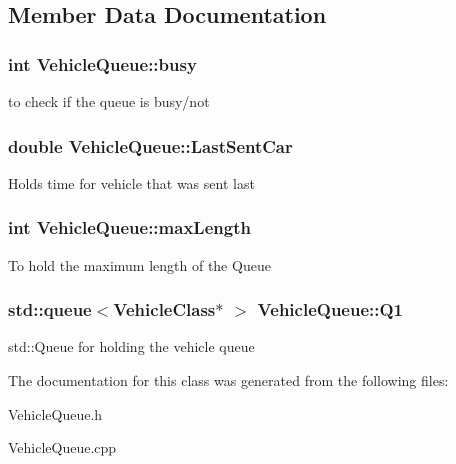 \subsection{Member Data Documentation}
\hypertarget{class_vehicle_queue_a4ce16496b3665d0b91a8b5baf158c3a3}{
\subsubsection[{busy}]{\setlength{\rightskip}{0pt plus 5cm}int Vehicle\-Queue\-::busy}}\label{class_vehicle_queue_a4ce16496b3665d0b91a8b5baf158c3a3}
to check if the queue is busy/not \hypertarget{class_vehicle_queue_a329310055fa8fd635fd6740a8400b88d}{
\subsubsection[{Last\-Sent\-Car}]{\setlength{\rightskip}{0pt plus 5cm}double Vehicle\-Queue\-::\-Last\-Sent\-Car}}\label{class_vehicle_queue_a329310055fa8fd635fd6740a8400b88d}
Holds time for vehicle that was sent last \hypertarget{class_vehicle_queue_a8634f859977fc6937f91abc302d56318}{
\subsubsection[{max\-Length}]{\setlength{\rightskip}{0pt plus 5cm}int Vehicle\-Queue\-::max\-Length}}\label{class_vehicle_queue_a8634f859977fc6937f91abc302d56318}
To hold the maximum length of the Queue \hypertarget{class_vehicle_queue_a64dd34f2ca5bee22e9bf07be665c4d13}{
\subsubsection[{Q1}]{\setlength{\rightskip}{0pt plus 5cm}std\-::queue$<${\bf Vehicle\-Class}$\ast$ $>$ Vehicle\-Queue\-::\-Q1}}\label{class_vehicle_queue_a64dd34f2ca5bee22e9bf07be665c4d13}
std\-::\-Queue for holding the vehicle queue 

The documentation for this class was generated from the following files\-:\begin{DoxyCompactItemize}
\item 
Vehicle\-Queue.\-h\item 
Vehicle\-Queue.\-cpp\end{DoxyCompactItemize}
